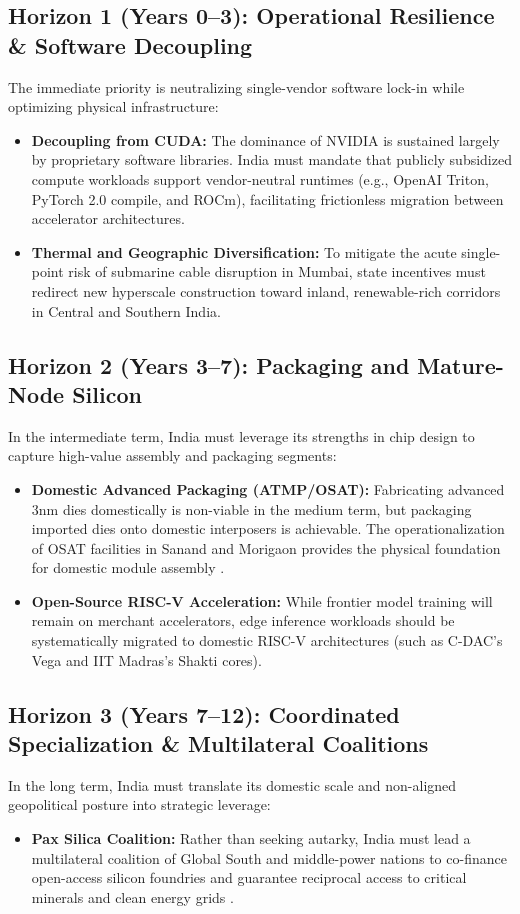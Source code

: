 \documentclass[conference,a4paper]{IEEEtran}
\begin{document}
\subsection{Horizon 1 (Years 0–3): Operational Resilience \& Software Decoupling}
The immediate priority is neutralizing single-vendor software lock-in while optimizing physical infrastructure:
\begin{itemize}
    \item \textbf{Decoupling from CUDA:} The dominance of NVIDIA is sustained largely by proprietary software libraries. India must mandate that publicly subsidized compute workloads support vendor-neutral runtimes (e.g., OpenAI Triton, PyTorch 2.0 compile, and ROCm), facilitating frictionless migration between accelerator architectures.
    \item \textbf{Thermal and Geographic Diversification:} To mitigate the acute single-point risk of submarine cable disruption in Mumbai, state incentives must redirect new hyperscale construction toward inland, renewable-rich corridors in Central and Southern India.
\end{itemize}

\subsection{Horizon 2 (Years 3–7): Packaging and Mature-Node Silicon}
In the intermediate term, India must leverage its strengths in chip design to capture high-value assembly and packaging segments:
\begin{itemize}
    \item \textbf{Domestic Advanced Packaging (ATMP/OSAT):} Fabricating advanced 3nm dies domestically is non-viable in the medium term, but packaging imported dies onto domestic interposers is achievable. The operationalization of OSAT facilities in Sanand and Morigaon provides the physical foundation for domestic module assembly \cite{niti2026semicon}.
    \item \textbf{Open-Source RISC-V Acceleration:} While frontier model training will remain on merchant accelerators, edge inference workloads should be systematically migrated to domestic RISC-V architectures (such as C-DAC's Vega and IIT Madras's Shakti cores).
\end{itemize}

\subsection{Horizon 3 (Years 7–12): Coordinated Specialization \& Multilateral Coalitions}
In the long term, India must translate its domestic scale and non-aligned geopolitical posture into strategic leverage:
\begin{itemize}
    \item \textbf{Pax Silica Coalition:} Rather than seeking autarky, India must lead a multilateral coalition of Global South and middle-power nations to co-finance open-access silicon foundries and guarantee reciprocal access to critical minerals and clean energy grids \cite{stimson2026sovereignty}.
\end{itemize}
\end{document}
